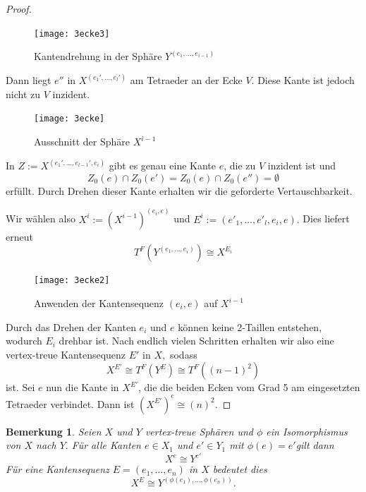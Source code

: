 \documentclass[12pt,titlepage,twoside,cleardoublepage]{article}
\theoremstyle{nummermitklammern}
\newtheorem{bemerkung}[temp]{Bemerkung}
\newtheorem{bemerkung}[zahl]{Bemerkung}
\numberwithin{equation}{section}
\begin{document}
\begin{proof}
\begin{itemize}
\begin{figure}[H]
\begin{center}
\texttt{[image: 3ecke3]}
\end{center}
\caption{Kantendrehung in der Sphäre $Y^{(e_1,\ldots,e_{i-1})}$}
\end{figure}
Dann liegt $e''$ in $X^{(e_1',\ldots,e_l')}$ am Tetraeder an der Ecke $V.$ Diese Kante ist jedoch nicht zu $V$ inzident.  
\begin{figure}[H]
\begin{center}
\texttt{[image: 3ecke]}
\end{center}
\caption{Ausschnitt der Sphäre $X^{i-1}$}
\end{figure}
In $Z:=X^{(e_1',\ldots,e_{l-1}',e_i)}$ gibt es genau eine Kante $e$, die zu $V$ inzident ist und 
 \[
Z_0(e)\cap Z_0(e')=Z_0(e)\cap Z_0(e'')=\emptyset
\]
erfüllt. Durch Drehen dieser Kante erhalten wir die geforderte Vertauschbarkeit.

Wir wählen also $X^{i}:={(X^{i-1})}^{(e_i,e)}$ und $E^{i}:=(e'_1,\ldots,e'_l,e_i,e).$ Dies liefert erneut
\[
T^F(Y^{(e_1,\ldots,e_i)})\cong X^{E_{i}}
\] 
\begin{figure}[H]
\begin{center}
\texttt{[image: 3ecke2]}
\end{center}
\caption{Anwenden der Kantensequenz $(e_i,e)$ auf $X^{i-1}$}
\end{figure}
\end{itemize}
 Durch das Drehen der Kanten $e_i$ und $e$ können keine 2-Taillen entstehen, wodurch $E_{i}$ drehbar ist.
Nach endlich vielen Schritten erhalten wir also eine vertex-treue Kantensequenz $E'$ in $X,$ sodass 
\[X^{E'}\cong T^F(Y^E) \cong T^F((n-1)^2)
\]ist.
Sei $e$ nun die Kante in $X^{E'}$, die die beiden Ecken vom Grad 5 am eingesetzten Tetraeder verbindet. Dann ist $(X^{E'})^e\cong (n)^2.$
\end{proof}
\begin{bemerkung}
Seien $X$ und $Y$ vertex-treue Sphären und $\phi$ ein Isomorphismus von $X$ nach $Y.$ Für alle Kanten $e\in X_1$ und $e'\in Y_1$ mit $\phi(e)=e'$gilt dann
\[ 
X^e \cong Y^{e'} 
\]
Für eine Kantensequenz $E=(e_1,\ldots,e_n)$ in $X$ bedeutet dies 
\[
X^E\cong Y^{(\phi(e_1),\ldots,\phi(e_n))}.
\]
\end{bemerkung}
\end{document}
